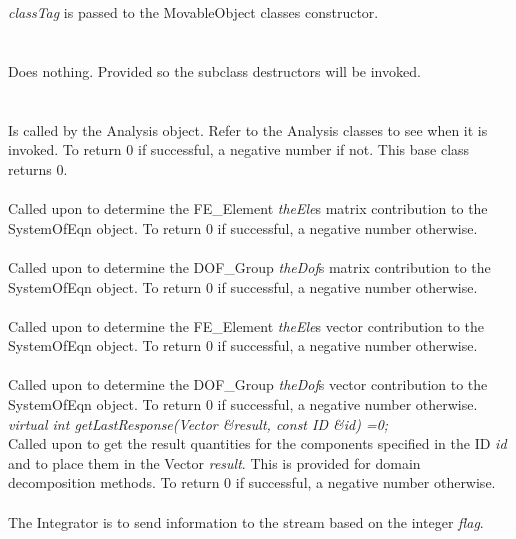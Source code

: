  \\
\\ 
{\em classTag} is passed to the MovableObject classes constructor. \\

 \\
\\ 
Does nothing. Provided so the subclass destructors will be invoked. \\

\\
 \\
Is called by the Analysis object. Refer to the Analysis classes to see
when it is invoked. To return $0$ if successful, a negative number if
not. This base class returns $0$.\\

 \\
Called upon to determine the FE\_Element {\em theEle}s matrix
contribution to the SystemOfEqn object. To return $0$ if successful,
a negative number otherwise. \\ 
 

 \\
Called upon to determine the DOF\_Group {\em theDof}s matrix
contribution to the SystemOfEqn object. To return $0$ if successful,
a negative number otherwise. \\ 


 \\
Called upon to determine the FE\_Element {\em theEle}s vector
contribution to the SystemOfEqn object. To return $0$ if successful,
a negative number otherwise. \\ 


 \\
Called upon to determine the DOF\_Group {\em theDof}s vector
contribution to the SystemOfEqn object. To return $0$ if successful,
a negative number otherwise. \\ 

{\em virtual int getLastResponse(Vector \&result, const ID \&id) =0;} \\
Called upon to get the result quantities for the components specified
in the ID {\em id} and to place them in the Vector {\em result}. This
is provided for domain decomposition methods. To return $0$ if
successful, a negative number otherwise. \\ 

\\
The Integrator is to send information to the stream based on the
integer {\em flag}. 

